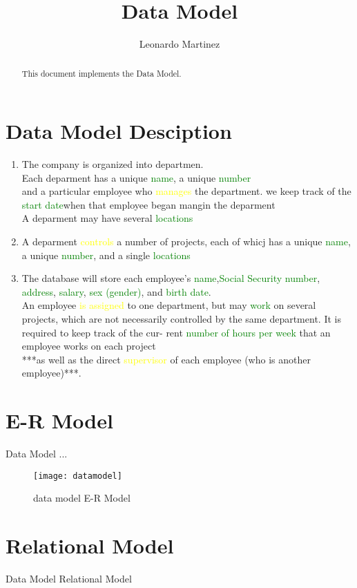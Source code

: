 \documentclass[10pt]{article}         %
\title{Data Model}
\author{Leonardo Martinez}
\begin{document}
\maketitle

\begin{abstract}
This document implements the Data Model.
\end{abstract}

\section{Data Model Desciption}

\begin{enumerate}

\item
The company is organized into departmen.\\
Each deparment has a unique \textcolor{green}{name}, a unique \textcolor{green}{number}\\
and a particular employee who \textcolor{yellow}{manages} the department.
we keep track of the \textcolor{green}{start date}when that employee began mangin the deparment\\
A deparment may have several \textcolor{green}{locations}

\item
A deparment \textcolor{yellow}{controls} a number of projects, each of whicj has a unique \textcolor{green}{name}, a unique \textcolor{green}{number}, and a single \textcolor{green}{locations}

\item
The database will store each employee’s \textcolor{green}{name},\textcolor{green}{Social Security number},\textcolor{green}{
address}, \textcolor{green}{salary}, \textcolor{green}{sex (gender)}, and \textcolor{green}{birth date}. 
\\
An employee \textcolor{yellow}{is assigned} to one
department, but may \textcolor{green}{work} on several projects, which are not necessarily
controlled by the same department. It is required to keep track of the cur-
rent \textcolor{green}{number of hours per week} that an employee works on each project
\\
***as well as the direct \textcolor{yellow}{supervisor} of each employee (who is another employee)***.

\end{enumerate}


\section{E-R Model}

Data Model ...
\begin{figure}[h]
     \texttt{[image: datamodel]}
     \caption{data model E-R Model}
\end{figure}

\section{Relational Model}
Data Model  Relational Model
\end{document}
